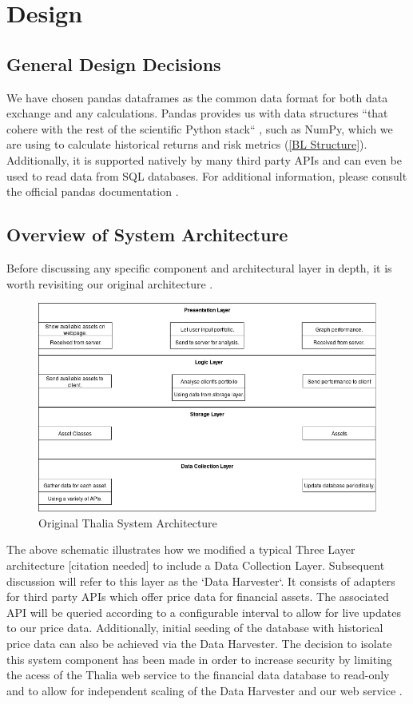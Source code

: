 \documentclass[main.tex]{subfiles}
\begin{document}
\section{Design}

\subsection{General Design Decisions}
We have chosen pandas dataframes \cite{pandas} as the common data format for both data exchange and any calculations. Pandas provides us with data structures ``that cohere with the rest of the scientific Python stack`` \cite{mckinney2011pandas}, such as NumPy, which we are using to calculate historical returns and risk metrics (\ref{BL Structure}). Additionally, it is supported natively by many third party APIs and can even be used to read data from SQL databases. For additional information, please consult the official pandas documentation \cite{pandas}.

\subsection{Overview of System Architecture}

Before discussing any specific component and architectural layer in depth, it is worth revisiting our original architecture \cite{TR}.
\begin{figure}[H]
    \caption{Original Thalia System Architecture \cite{TR}}
    \includegraphics[width=\textwidth]{04Design/04Pictures/architecture_layer_diagram.png}
\end{figure}
The above schematic illustrates how we modified a typical Three Layer architecture [citation needed] to include a Data Collection Layer. Subsequent discussion will refer to this layer as the `Data Harvester`. It consists of adapters for third party APIs which offer price data for financial assets. The associated API will be queried according to a configurable interval to allow for live updates to our price data. Additionally, initial seeding of the database with historical price data can also be achieved via the Data Harvester. The decision to isolate this system component has been made in order to increase security by limiting the acess of the Thalia web service to the financial data database to read-only and to allow for independent scaling of the Data Harvester and our web service \cite{TR}.
\end{document}
